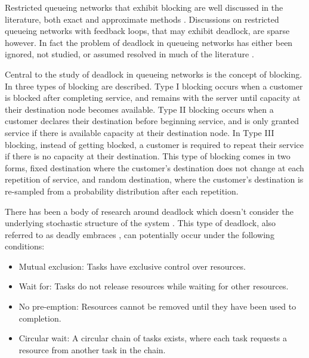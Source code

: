 \documentclass{article}
\numberwithin{equation}{section}
\begin{document}
Restricted queueing networks that exhibit blocking are well discussed in the
literature, both exact \cite{hunt56, baber08, aviitzhakyadin65, koizumietal05,
latoucheneuts80, perrosetal88, gordonnewell67} and approximate methods
\cite{takahashi80, korporaaletal00, onvural90, perrosetal88, dalleryfrein93,
allonetal13, osoriobierlaire09}.
Discussions on restricted queueing networks with feedback loops, that may
exhibit deadlock, are sparse however.
In fact the problem of deadlock in queueing networks has either been ignored,
not studied, or assumed resolved in much of the literature \cite{onvural90,
perrosetal88, osoriobierlaire09}.

Central to the study of deadlock in queueing networks is the concept of
blocking.
In \cite{onvuralperros86} three types of blocking are described.
Type I blocking occurs when a customer is blocked after completing service, and
remains with the server until capacity at their destination node becomes
available.
Type II blocking occurs when a customer declares their destination before
beginning service, and is only granted service if there is available capacity at
their destination node.
In Type III blocking, instead of getting blocked, a customer is required to
repeat their service if there is no capacity at their destination.
This type of blocking comes in two forms, fixed destination where the
customer's destination does not change at each repetition of service, and
random destination, where the customer's destination is re-sampled from a
probability distribution after each repetition.

There has been a body of research around deadlock which doesn't consider the
underlying stochastic structure of the system \cite{coffmanelphick71,
reveliotis15a, reveliotis15b}.
This type of deadlock, also referred to as deadly embraces
\cite{coffmanelphick71}, can potentially occur under the following conditions:

\begin{itemize}
  \item Mutual exclusion: Tasks have exclusive control over resources.
  \item Wait for: Tasks do not release resources while waiting for other
  resources.
  \item No pre-emption: Resources cannot be removed until they have been used
  to completion.
  \item Circular wait: A circular chain of tasks exists, where each task
  requests a resource from another task in the chain.
\end{itemize}
\end{document}
